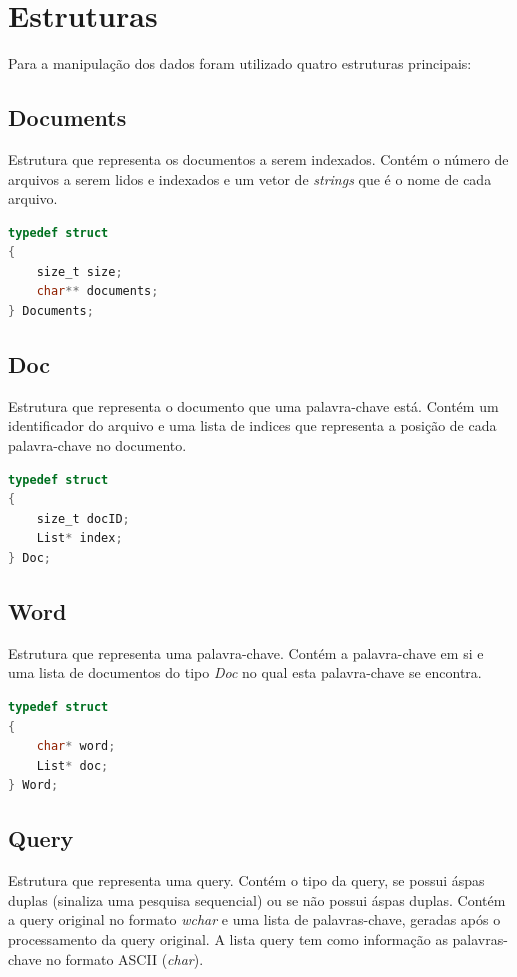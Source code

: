 \documentclass[a4paper,12pt]{article}
\begin{document}
\section{Estruturas}
Para a manipulação dos dados foram utilizado quatro estruturas principais: 


\subsection{Documents}
Estrutura que representa os documentos a serem indexados. Contém o número de arquivos a serem 
lidos e indexados e um vetor de \emph{strings} que é o nome de cada arquivo.

\begin{lstlisting}[language=C, caption=Estrutura Documents]
typedef struct
{
	size_t size;
	char** documents;
} Documents;
\end{lstlisting}


\subsection{Doc}
Estrutura que representa o documento que uma palavra-chave está. Contém um identificador do arquivo 
e uma lista de indices que representa a posição de cada palavra-chave no documento.

\begin{lstlisting}[language=C, caption=Estrutura Doc]
typedef struct
{
	size_t docID;
	List* index;
} Doc;
\end{lstlisting}


\subsection{Word}
Estrutura que representa uma palavra-chave. Contém a palavra-chave em si e uma lista de documentos do tipo \emph{Doc} 
no qual esta palavra-chave se encontra.

\begin{lstlisting}[language=C, caption=Estrutura Word]
typedef struct
{
	char* word;
	List* doc;
} Word;
\end{lstlisting}


\subsection{Query}
Estrutura que representa uma query. Contém o tipo da query, se possui áspas duplas (sinaliza uma pesquisa sequencial) 
ou se não possui áspas duplas. Contém a query original no formato \emph{wchar} e uma lista de palavras-chave, geradas 
após o processamento da query original. A lista query tem como informação as palavras-chave no formato ASCII (\emph{char}).
\end{document}
